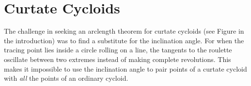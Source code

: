 \documentclass{ximera}
\begin{document}




\section{Curtate Cycloids}

The challenge in seeking an arclength theorem for curtate cycloids (see Figure in the introduction) was to find a substitute for the inclination angle. For when the tracing point lies inside a circle rolling on a line, the tangents to the roulette oscillate between two extremes instead of making complete revolutions. This makes it impossible to use the inclination angle to pair points of a curtate cycloid with \emph{all} the points of an ordinary cycloid.





\end{document}
